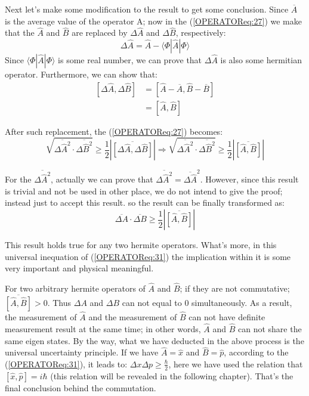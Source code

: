 Next let's make some modification to the result to get some
conclusion. Since $\overline{A}$ is the average value of the
operator A; now in the (\ref{OPERATOReq:27}) we make that the
$\hat{A}$ and $\hat{B}$ are replaced by $\Delta\hat{A}$ and $\Delta
\hat{B}$, respectively:
\begin{equation}\label{}
\Delta \hat{A} = \hat{A} - \langle\Phi|\hat{A}|\Phi\rangle
\end{equation}
Since $\langle\Phi|\hat{A}|\Phi\rangle$ is some real number, we can
prove that $\Delta\hat{A}$ is also some hermitian operator.
Furthermore, we can show that:
\begin{equation}\label{}
\begin{split}
  [\Delta \hat{A}, \Delta \hat{B}] &=
  [\hat{A} - \overline{A}, \hat{B} - \overline{B}] \\
    &= [\hat{A}, \hat{B}]
\end{split}
\end{equation}

After such replacement, the (\ref{OPERATOReq:27}) becomes:
\begin{equation}\label{OPERATOReq:28}
\sqrt{\overline{\Delta \hat{A}^{2}}\cdot \overline{\Delta
\hat{B}^{2}}} \geq \frac{1}{2} \left|\overline{[\Delta\hat{A},
\Delta\hat{B}]} \right| \Rightarrow \sqrt{\overline{\Delta
\hat{A}^{2}}\cdot \overline{\Delta \hat{B}^{2}}} \geq \frac{1}{2}
\left|\overline{[\hat{A}, \hat{B}]} \right|
\end{equation}

For the $\overline{\Delta \hat{A}^{2}}$, actually we can prove that
$\overline{\Delta \hat{A}^{2}}= \overline{\Delta \hat{A}}^{2}$.
However, since this result is trivial and not be used in other
place, we do not intend to give the proof; instead just to accept
this result. so the result can be finally transformed as:
\begin{equation}\label{OPERATOReq:31}
\overline{\Delta A}\cdot \overline{\Delta B}   \geq \frac{1}{2}
\left|\overline{[\hat{A}, \hat{B}]} \right|
\end{equation}

This result holds true for any two hermite operators. What's more,
in this universal inequation of (\ref{OPERATOReq:31}) the
implication within it is some very important and physical
meaningful.

For two arbitrary hermite operators of $\hat{A}$ and $\hat{B}$; if
they are not commutative; $\overline{[\hat{A}, \hat{B}]} > 0$. Thus
$\Delta A$ and $\Delta B$ can not equal to $0$ simultaneously. As a
result, the measurement of $\hat{A}$ and the measurement of
$\hat{B}$ can not have definite measurement result at the same time;
in other words, $\hat{A}$ and $\hat{B}$ can not share the same eigen
states. By the way, what we have deducted in the above process is
the universal uncertainty principle. If we have $\hat{A} = \hat{x}$
and $\hat{B} = \hat{p}$, according to the (\ref{OPERATOReq:31}), it
leads to: $\Delta x\Delta p \geq \frac{\hbar}{2}$, here we have used
the relation that $[\hat{x}, \hat{p}] = i\hbar$ (this relation will
be revealed in the following chapter). That's the final conclusion
behind the commutation.

